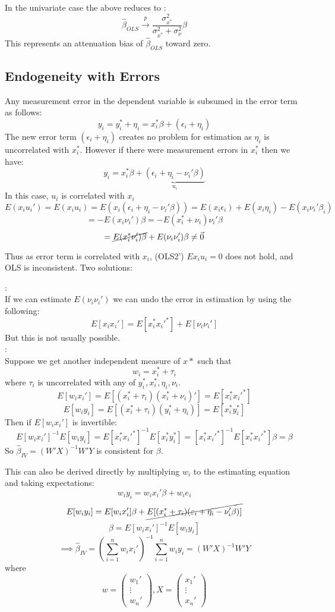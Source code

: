 \documentclass[DIV=14,titlepage=false]{scrreprt}
\begin{document}
In the univariate case the above reduces to :
\[\hat\beta_{OLS}\xrightarrow{p}\frac{\sigma^2_{x^*}}{\sigma^2_{x^*}+\sigma^2_{\nu}}\beta\]
This represents an attenuation bias of \(\hat\beta_{OLS}\) toward zero.

\subsection{Endogeneity with Errors}
Any measurement error in the dependent variable is subsumed in the error term as follows:
\[y_i=y_i^*+\eta_i=x_i^*\beta+(\epsilon_i+\eta_i)\]
The new error term \((\epsilon_i+\eta_i)\) creates no problem for estimation as \(\eta_i\) is uncorrelated with \(x_i^*\). However if there were measurement errors in \(x_i^*\) then we have:
\[y_i=x_i^*\beta+\underbrace{(\epsilon_i+\eta_i-\nu_i'\beta)}_{u_i}\]
In this case, \(u_i\) is correlated with \(x_i\)
\[E(x_iu_i')=E(x_iu_i)=E(x_i(\epsilon_i+\eta_i-\nu_i'\beta))=E(x_i\epsilon_i)+E(x_i\eta_i)-E(x_i\nu_i'\beta_i)\]
\[=-E(x_i\nu_i')\beta=-E(x_i^*+\nu_i)\nu_i'\beta\]
\[=\cancel{E(x_i^*\nu_i')\beta}+E(\nu_i\nu_i')\beta\neq\vec{0}\]

Thus as error term is correlated with \(x_i\), (OLS2') \(Ex_iu_i=0\) does not hold, and OLS is inconsistent.
Two solutions:

\underline{}:\\
If we can estimate \(E(\nu_i\nu_i')\) we can undo the error in estimation by using the following:
\[E[x_ix_i']=E[x_i^*x_i'^*]+E[\nu_i\nu_i']\]
But this is not usually possible.
\\ \underline{}:\\
Suppose we get another independent measure of \(x*\) such that
\[w_i=x_i^*+\tau_i\]
where \(\tau_i\) is uncorrelated with any of \(y_i^*,x_i^*,\eta_i,\nu_i\).
\[E[w_ix_i']=E[(x_i^*+\tau_i)(x_i^*+\nu_i)']=E[x_i^*x_i'^*]\]
\[E[w_iy_i]= E[(x_i^*+\tau_i)(y_i^*+\eta_i)]=E[x_i^*y_i^*]\]
Then if \(E[w_ix_i']\) is invertible:
\[E[w_ix_i']^{-1}E[w_iy_i]=E[x_i^*x_i'^*]^{-1}E[x_i^*y_i^*]=[x_i^*x_i'^*]^{-1}E[x_i^*x_i'^*]\beta=\beta\]
So \(\hat\beta_{IV} = (W'X)^{-1}W'Y\) is consistent for \(\beta\).

This can also be derived directly by multiplying \(w_i\) to the estimating equation and taking expectations:
\[w_iy_i=w_ix_i'\beta+w_ie_i\]
\[E[w_iy_i]=E[w_ix_i']\beta+\cancel{E[(x_i^*+\tau_i)(\epsilon_i+\eta_i-\nu_i'\beta)]}\]
\[\beta=E[w_ix_i']^{-1}E[w_iy_i]\]
\[\implies \hat\beta_{IV}=(\sum_{i=1}^nw_ix_i')^{-1}\sum_{i=1}^nw_iy_i=(W'X)^{-1}W'Y\]
where
\[w=\begin{pmatrix}
    w_1'\\
    \vdots\\
    w_n'
\end{pmatrix}, X=\begin{pmatrix}
    x_1'\\
    \vdots\\
    x_n'
\end{pmatrix}\]
\end{document}
